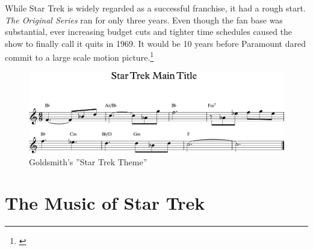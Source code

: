While Star Trek is widely regarded as a successful franchise, it had a rough start. \textit{The Original Series} ran for only three years. Even though the fan base was substantial, ever increasing budget cuts and tighter time schedules caused the show to finally call it quits in 1969. It would be 10 years before Paramount dared commit to a large scale motion picture.\footnote{\citealt[p. 87]{bond_music_1998}}



\begin{figure}
\includegraphics[width=\linewidth]{gfx/snippet_main_theme}
\caption{Goldsmith's ''Star Trek Theme''}
\end{figure}

\section{The Music of Star Trek} 

